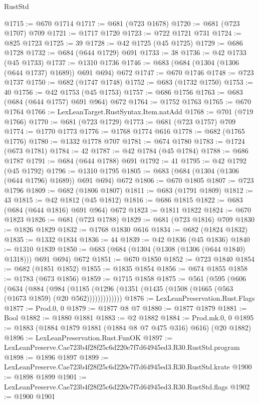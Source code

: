 \begin{lexlean}{RustStd}
\begin{coremodule}
@1715 := @670 @1714
@1717 := @681 (@723 @1678)
@1720 := @681 (@723 @1707) @709
@1721 := @1717 @1720
@1723 := @722 @1721 @731
@1724 := @825 @1723
@1725 := 39
@1728 := @42 @1725 (@45 @1725)
@1729 := @686 @1728
@1732 := @684 (@644 @1729) @691
@1733 := 38
@1736 := @42 @1733 (@45 @1733)
@1737 := @1310 @1736
@1746 := @683 (@684 (@1304 (@1306 (@644 @1737) @1689)) @691 @694) @672
@1747 := @670 @1746
@1748 := @723 @1737
@1750 := @682 (@1747 @1748)
@1752 := @683 (@1732 @1750)
@1753 := 40
@1756 := @42 @1753 (@45 @1753)
@1757 := @686 @1756
@1763 := @683 (@684 (@644 @1757) @691 @964) @672
@1764 := @1752 @1763
@1765 := @670 @1764
@1766 := LexLeanTarget.RustSyntax.Item.natAdd
@1768 := @701 (@719 @1766)
@1770 := @681 (@723 @1729)
@1773 := @681 (@723 @1757) @709
@1774 := @1770 @1773
@1776 := @1768 @1774 @616
@1778 := @682 (@1765 @1776)
@1780 := @1332 @1778 @707
@1781 := @674 @1780
@1783 := @1724 (@673 @1781)
@1784 := 42
@1787 := @42 @1784 (@45 @1784)
@1788 := @686 @1787
@1791 := @684 (@644 @1788) @691
@1792 := 41
@1795 := @42 @1792 (@45 @1792)
@1796 := @1310 @1795
@1805 := @683 (@684 (@1304 (@1306 (@644 @1796) @1689)) @691 @694) @672
@1806 := @670 @1805
@1807 := @723 @1796
@1809 := @682 (@1806 @1807)
@1811 := @683 (@1791 @1809)
@1812 := 43
@1815 := @42 @1812 (@45 @1812)
@1816 := @686 @1815
@1822 := @683 (@684 (@644 @1816) @691 @964) @672
@1823 := @1811 @1822
@1824 := @670 @1823
@1826 := @681 (@723 @1788)
@1829 := @681 (@723 @1816) @709
@1830 := @1826 @1829
@1832 := @1768 @1830 @616
@1834 := @682 (@1824 @1832)
@1835 := @1332 @1834
@1836 := 44
@1839 := @42 @1836 (@45 @1836)
@1840 := @1310 @1839
@1850 := @683 (@684 (@1304 (@1308 (@1306 (@644 @1840) @1318))) @691 @694) @672
@1851 := @670 @1850
@1852 := @723 @1840
@1854 := @682 (@1851 @1852)
@1855 := @1835 @1854
@1856 := @674 @1855
@1858 := @1783 (@673 @1856)
@1859 := @1715 @1858
@1875 := @561
    (@595
      (@606
        (@634
          (@884
            (@984
              (@1185 (@1296 (@1351 (@1435 (@1508 (@1665 (@563 (@1673 @1859) (@20 @562)))))))))))))
@1876 := LexLeanPreservation.Rust.Flags
@1877 := Prod.{0, 0}
@1879 := @1877 @8 @7
@1880 := @1877 @1879
@1881 := Bool
@1882 := @1880 @1881
@1883 := @2 @1882
@1884 := Prod.mk.{0, 0}
@1895 := @1883 (@1884 @1879 @1881 (@1884 @8 @7 @475 @316) @616) (@20 @1882)
@1896 := LexLeanPreservation.Rust.FunOK
@1897 := LexLeanPreserve.Cae723b4f28f25c6d220e7f7d64945ed3.R30.RustStd.program
@1898 := @1896 @1897
@1899 := LexLeanPreserve.Cae723b4f28f25c6d220e7f7d64945ed3.R30.RustStd.krate
@1900 := @1898 @1899
@1901 := LexLeanPreserve.Cae723b4f28f25c6d220e7f7d64945ed3.R30.RustStd.flags
@1902 := @1900 @1901

\end{coremodule}
\end{lexlean}
